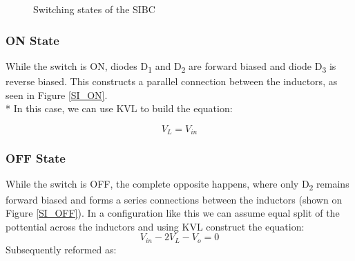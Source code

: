 \begin{figure}[H]%
    \centering
    \qquad
    \caption{Switching states of the SIBC}%
     \label{fig:SI_States}%
\end{figure}
\vspace{-8mm}
\subsubsection{ON State}
While the switch is ON, diodes D\textsubscript{1} and D\textsubscript{2} are forward biased and diode D\textsubscript{3} is reverse biased.
This constructs a parallel connection between the inductors, as seen in Figure \ref{SI_ON}.
\\*
In this case, we can use KVL to build the equation: 

\begin{equation}
	V_L=V_{in}
	\label{eq:SI_KVL_ON}
\end{equation}
\vspace{-10mm}
\subsubsection{OFF State}
While the switch is OFF, the complete opposite happens, where only D\textsubscript{2} remains forward biased and forms a series connections between the inductors (shown on Figure \ref{SI_OFF}).
In a configuration like this we can assume equal split of the pottential across the inductors and using KVL construct the equation:
\begin{equation}
	V_{in}-2V_L-V_o=0
	\label{eq:SI_KVL_OFF}
\end{equation}
Subsequently reformed as:


